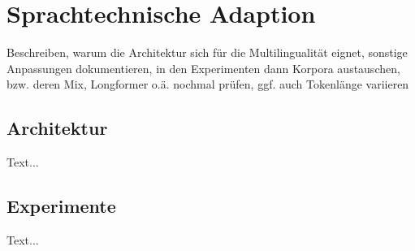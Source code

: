 \chapter{Sprachtechnische Adaption}
\thispagestyle{fancy}
\label{chap:Sprachtechnische Adaption}

\noindent
Beschreiben, warum die Architektur sich für die Multilingualität eignet, sonstige Anpassungen dokumentieren, in den Experimenten dann Korpora austauschen, bzw. deren Mix, Longformer o.ä. nochmal prüfen, ggf. auch Tokenlänge variieren\\


\section{Architektur}
Text...


\section{Experimente}
Text...
